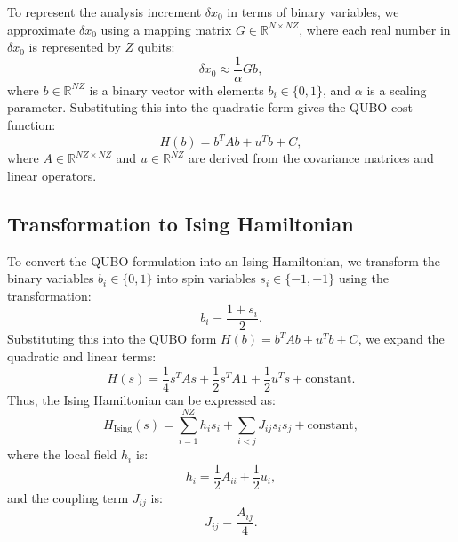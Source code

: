\documentclass{article}
\begin{document}
To represent the analysis increment \( \delta x_0 \) in terms of binary variables, we approximate \( \delta x_0 \) using a mapping matrix \( G \in \mathbb{R}^{N \times NZ} \), where each real number in \( \delta x_0 \) is represented by \( Z \) qubits:
\[
\delta x_0 \approx \frac{1}{\alpha} G b,
\]
where \( b \in \mathbb{R}^{NZ} \) is a binary vector with elements \( b_i \in \{0, 1\} \), and \( \alpha \) is a scaling parameter. Substituting this into the quadratic form gives the QUBO cost function:
\[
H(b) = b^T A b + u^T b + C,
\]
where \( A \in \mathbb{R}^{NZ \times NZ} \) and \( u \in \mathbb{R}^{NZ} \) are derived from the covariance matrices and linear operators.

\subsection{Transformation to Ising Hamiltonian}

To convert the QUBO formulation into an Ising Hamiltonian, we transform the binary variables \( b_i \in \{0, 1\} \) into spin variables \( s_i \in \{-1, +1\} \) using the transformation:
\[
b_i = \frac{1 + s_i}{2}.
\]
Substituting this into the QUBO form \( H(b) = b^T A b + u^T b + C \), we expand the quadratic and linear terms:
\[
H(s) = \frac{1}{4} s^T A s + \frac{1}{2} s^T A \mathbf{1} + \frac{1}{2} u^T s + \text{constant}.
\]
Thus, the Ising Hamiltonian can be expressed as:
\[
H_{\text{Ising}}(s) = \sum_{i=1}^{NZ} h_i s_i + \sum_{i < j} J_{ij} s_i s_j + \text{constant},
\]
where the local field \( h_i \) is:
\[
h_i = \frac{1}{2} A_{ii} + \frac{1}{2} u_i,
\]
and the coupling term \( J_{ij} \) is:
\[
J_{ij} = \frac{A_{ij}}{4}.
\]
\end{document}
